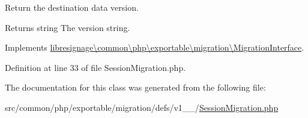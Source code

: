 Return the destination data version.

\begin{DoxyReturn}{Returns}
string The version string. 
\end{DoxyReturn}


Implements \hyperlink{interfacelibresignage_1_1common_1_1php_1_1exportable_1_1migration_1_1MigrationInterface_a9eddabf63771d4d1081bd6d067c7dff5}{libresignage\textbackslash{}common\textbackslash{}php\textbackslash{}exportable\textbackslash{}migration\textbackslash{}\+Migration\+Interface}.



Definition at line 33 of file Session\+Migration.\+php.



The documentation for this class was generated from the following file\+:\begin{DoxyCompactItemize}
\item 
src/common/php/exportable/migration/defs/v1\+\_\+\_/\hyperlink{v1__0__0_2SessionMigration_8php}{Session\+Migration.\+php}\end{DoxyCompactItemize}
